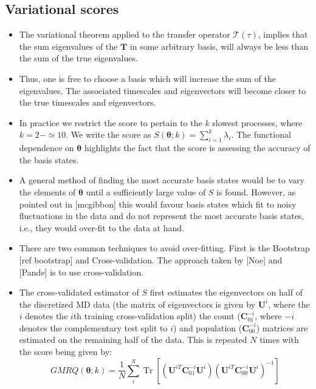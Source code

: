 \documentclass[journal=jacsat,manuscript=article]{achemso}
\begin{document}
\subsection{Variational scores}
\begin{itemize}
    \item The variational theorem applied to the transfer operator $\mathcal{T}(\tau)$, implies that the sum eigenvalues of the $\mathbf{T}$ in some arbitrary basis, will always be less than the sum of the true eigenvalues. 
    \item Thus, one is free to choose a basis which will increase the sum of the eigenvalues. The associated timescales and eigenvectors will become closer to the true timescales and eigenvectors. 
    \item In practice we restrict the score to pertain to the $k$ slowest processes, where $k=2 - \simeq 10$. We write the score as $S(\bm{\theta}; k) = \sum_{i=1}^{k}\lambda_{i}$. The functional dependence on $\bm{\theta}$ highlights the fact that the score is assessing the accuracy of the basis states. 
    \item A general method of finding the most accurate basis states would be to vary the elements of $\bm{\theta}$ until a sufficiently large value of $S$ is found.  However, as pointed out in [mcgibbon] this would favour basis states which fit to noisy fluctuations in the data and do not represent the most accurate basis states, i.e., they would over-fit to the data at hand.
    \item There are two common techniques to avoid over-fitting. First is the Bootstrap [ref bootstrap] and Cross-validation. The approach  taken by [Noe] and [Pande] is to use cross-validation. 
    \item The cross-validated estimator of $S$ first estimates the eigenvectors on half of the discretized MD data (the matrix of eigenvectors is given by $\mathbf{U}^{i}$, where the $i$ denotes the $i$th training cross-validation split) the count ($\mathbf{C}_{01}^{-i}$, where $-i$ denotes the complementary test split to $i$) and population ($\mathbf{C}_{00}^{-i}$) matrices are estimated on the remaining half of the data. This is repeated $N$ times with the score being given by: 
    \begin{equation}
        GMRQ(\bm{\theta}; k) = \frac{1}{N}\sum_{i}^{N} \operatorname{Tr}\left[(\mathbf{U}^{iT}\mathbf{C}_{01}^{-i}\mathbf{U}^{i})(\mathbf{U}^{iT}\mathbf{C}_{00}^{-i}\mathbf{U}^{i})^{-1}\right]
    \end{equation}\label{eqn:gmrq_cv_def}

\end{itemize}
\end{document}
